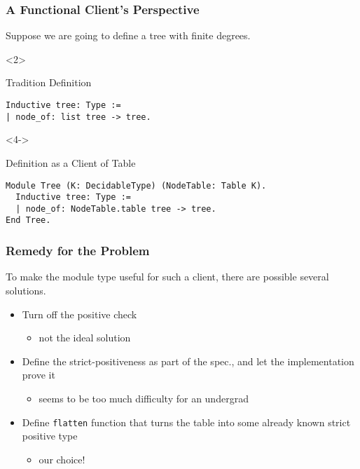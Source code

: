 \documentclass{beamer}
\begin{document}
\begin{frame}[t,fragile]
\frametitle{A Functional Client's Perspective}

Suppose we are going to define a tree with finite degrees. \\

\begin{onlyenv}<2>
  \begin{block}{Tradition Definition}
\begin{verbatim}
Inductive tree: Type :=
| node_of: list tree -> tree.
\end{verbatim}
  \end{block}
\end{onlyenv}


\begin{onlyenv}<4->
  \begin{alertblock}{Definition as a Client of Table}
\begin{verbatim}
Module Tree (K: DecidableType) (NodeTable: Table K).
  Inductive tree: Type :=
  | node_of: NodeTable.table tree -> tree.
End Tree.
\end{verbatim}
  \end{alertblock}
\end{onlyenv}


\end{frame}

\begin{frame}
\frametitle{Remedy for the Problem}

To make the module type useful for such a client, there are possible several
solutions.

\begin{itemize}
\item<2-> Turn off the positive check
  \begin{itemize}
  \item<3-> not the ideal solution
  \end{itemize}
\item<4-> Define the strict-positiveness as part of the spec., and
  let the implementation prove it
  \begin{itemize}
  \item<5-> seems to be too much difficulty for an undergrad
  \end{itemize}
\item<6-> Define \texttt{flatten} function that turns the table into some
  already known strict positive type
  \begin{itemize}
  \item<7-> our choice!
  \end{itemize}
\end{itemize}

\end{frame}
\end{document}
